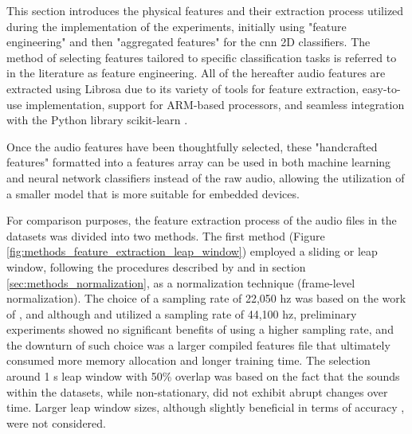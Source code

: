 This section introduces the physical features and their extraction process utilized during the implementation of the experiments, initially using "feature engineering" and then "aggregated features" for the \gls{cnn} 2D classifiers. The method of selecting features tailored to specific classification tasks is referred to in the literature as feature engineering. All of the hereafter audio features are extracted using Librosa \cite{McFee2015librosa_sw} due to its variety of tools for feature extraction, easy-to-use implementation, support for ARM-based processors, and seamless integration with the Python library scikit-learn \cite{scikitle61}.

Once the audio features have been thoughtfully selected, these "handcrafted features" formatted into a features array can be used in both machine learning and neural network classifiers instead of the raw audio, allowing the utilization of a smaller model that is more suitable for embedded devices.

For comparison purposes, the feature extraction process of the audio files in the datasets was divided into two methods. The first method (Figure \ref{fig:methods_feature_extraction_leap_window}) employed a sliding or leap window, following the procedures described by \textcite{Silva2019} and \textcite{Lhoest2021} in section \ref{sec:methods_normalization}, as a normalization technique (frame-level normalization). The choice of a sampling rate of 22,050 \gls{hz} was based on the work of \textcite{Salamon2017}, and although \textcite{PiczakESC2015} and \textcite{Bountourakis2015} utilized a sampling rate of 44,100 \gls{hz}, preliminary experiments showed no significant benefits of using a higher sampling rate, and the downturn of such choice was a larger compiled features file that ultimately consumed more memory allocation and longer training time. The selection around 1 \gls{s} leap window with 50\% overlap was based on the fact that the sounds within the datasets, while non-stationary, did not exhibit abrupt changes over time. Larger leap window sizes, although slightly beneficial in terms of accuracy \cite{Salamon2017}, were not considered. 

